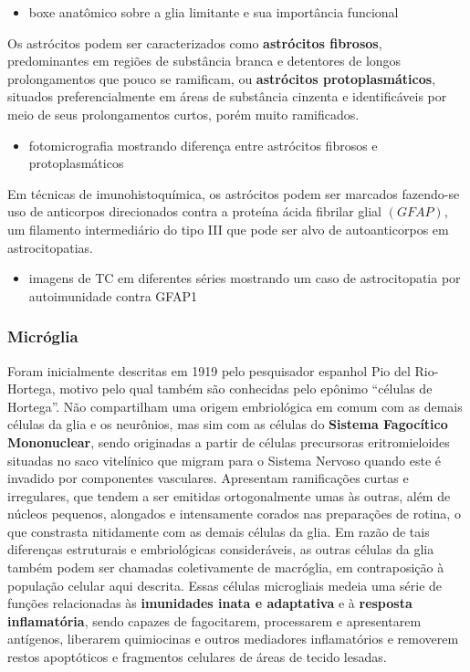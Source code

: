 \documentclass[
]{book}
\providecommand{\tightlist}{%
  \setlength{\itemsep}{0pt}\setlength{\parskip}{0pt}}
\theoremstyle{definition}
\theoremstyle{definition}
\theoremstyle{definition}
\theoremstyle{definition}
\theoremstyle{remark}
\begin{document}
\begin{itemize}
\tightlist
\item
  boxe anatômico sobre a glia limitante e sua importância funcional
\end{itemize}

Os astrócitos podem ser caracterizados como \textbf{astrócitos fibrosos}, predominantes em regiões de substância branca e detentores de longos prolongamentos que pouco se ramificam, ou \textbf{astrócitos protoplasmáticos}, situados preferencialmente em áreas de substância cinzenta e identificáveis por meio de seus prolongamentos curtos, porém muito ramificados.

\begin{itemize}
\tightlist
\item
  fotomicrografia mostrando diferença entre astrócitos fibrosos e protoplasmáticos
\end{itemize}

Em técnicas de imunohistoquímica, os astrócitos podem ser marcados fazendo-se uso de anticorpos direcionados contra a proteína ácida fibrilar glial \((GFAP)\), um filamento intermediário do tipo III que pode ser alvo de autoanticorpos em astrocitopatias.

\begin{itemize}
\tightlist
\item
  imagens de TC em diferentes séries mostrando um caso de astrocitopatia por autoimunidade contra GFAP1
\end{itemize}

\hypertarget{micruxf3glia}{%
\subsubsection*{Micróglia}\label{micruxf3glia}}

Foram inicialmente descritas em 1919 pelo pesquisador espanhol Pio del Rio-Hortega, motivo pelo qual também são conhecidas pelo epônimo ``células de Hortega''. Não compartilham uma origem embriológica em comum com as demais células da glia e os neurônios, mas sim com as células do \textbf{Sistema Fagocítico Mononuclear}, sendo originadas a partir de células precursoras eritromieloides situadas no saco vitelínico que migram para o Sistema Nervoso quando este é invadido por componentes vasculares. Apresentam ramificações curtas e irregulares, que tendem a ser emitidas ortogonalmente umas às outras, além de núcleos pequenos, alongados e intensamente corados nas preparações de rotina, o que constrasta nitidamente com as demais células da glia. Em razão de tais diferenças estruturais e embriológicas consideráveis, as outras células da glia também podem ser chamadas coletivamente de macróglia, em contraposição à população celular aqui descrita. Essas células microgliais medeia uma série de funções relacionadas às \textbf{imunidades inata e adaptativa} e à \textbf{resposta inflamatória}, sendo capazes de fagocitarem, processarem e apresentarem antígenos, liberarem quimiocinas e outros mediadores inflamatórios e removerem restos apoptóticos e fragmentos celulares de áreas de tecido lesadas.
\end{document}
